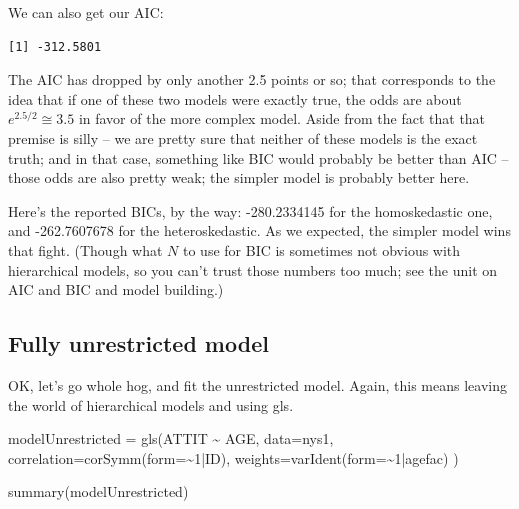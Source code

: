 \documentclass[
  letterpaper,
  DIV=11,
  numbers=noendperiod]{scrreprt}
\newenvironment{Shaded}{}{}
\newcommand{\AttributeTok}[1]{\textcolor[rgb]{0.49,0.56,0.16}{#1}}
\newcommand{\DecValTok}[1]{\textcolor[rgb]{0.25,0.63,0.44}{#1}}
\newcommand{\FunctionTok}[1]{\textcolor[rgb]{0.02,0.16,0.49}{#1}}
\newcommand{\NormalTok}[1]{#1}
\newcommand{\OtherTok}[1]{\textcolor[rgb]{0.00,0.44,0.13}{#1}}
\newcommand{\SpecialCharTok}[1]{\textcolor[rgb]{0.25,0.44,0.63}{#1}}
\begin{document}
We can also get our AIC:

\begin{Shaded}
\end{Shaded}

\begin{verbatim}
[1] -312.5801
\end{verbatim}

The AIC has dropped by only another 2.5 points or so; that corresponds
to the idea that if one of these two models were exactly true, the odds
are about \(e^{2.5/2}\cong 3.5\) in favor of the more complex model.
Aside from the fact that that premise is silly -- we are pretty sure
that neither of these models is the exact truth; and in that case,
something like BIC would probably be better than AIC -- those odds are
also pretty weak; the simpler model is probably better here.

Here's the reported BICs, by the way: -280.2334145 for the homoskedastic
one, and -262.7607678 for the heteroskedastic. As we expected, the
simpler model wins that fight. (Though what \(N\) to use for BIC is
sometimes not obvious with hierarchical models, so you can't trust those
numbers too much; see the unit on AIC and BIC and model building.)

\subsection{Fully unrestricted model}\label{fully-unrestricted-model}

OK, let's go whole hog, and fit the unrestricted model. Again, this
means leaving the world of hierarchical models and using gls.

\begin{Shaded}
\begin{Highlighting}[]
\NormalTok{modelUnrestricted }\OtherTok{=} \FunctionTok{gls}\NormalTok{(ATTIT }\SpecialCharTok{\textasciitilde{}}\NormalTok{ AGE, }
               \AttributeTok{data=}\NormalTok{nys1,}
               \AttributeTok{correlation=}\FunctionTok{corSymm}\NormalTok{(}\AttributeTok{form=}\SpecialCharTok{\textasciitilde{}}\DecValTok{1}\SpecialCharTok{|}\NormalTok{ID),}
               \AttributeTok{weights=}\FunctionTok{varIdent}\NormalTok{(}\AttributeTok{form=}\SpecialCharTok{\textasciitilde{}}\DecValTok{1}\SpecialCharTok{|}\NormalTok{agefac) )}


\FunctionTok{summary}\NormalTok{(modelUnrestricted)}
\end{Highlighting}
\end{Shaded}
\end{document}
